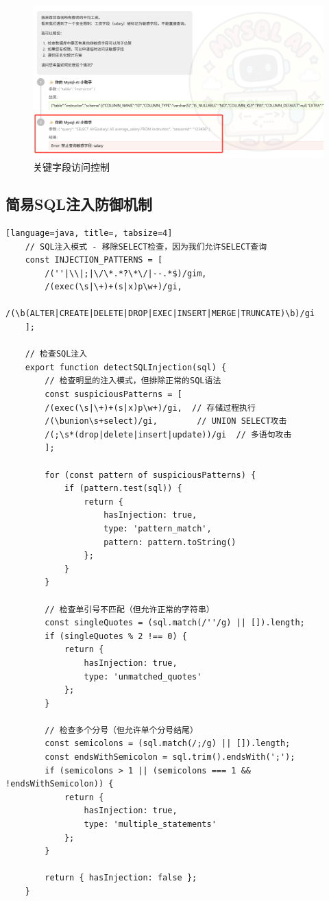 \documentclass{article}
\begin{document}
	\begin{figure}[H]
		\centering
		\includegraphics[width=15cm]{./images/5.敏感数据.jpg}
		\caption{关键字段访问控制}
	\end{figure}
	
	\subsection{简易SQL注入防御机制}
	
	\begin{lstlisting}[language=java, title=, tabsize=4]
	// SQL注入模式 - 移除SELECT检查，因为我们允许SELECT查询
	const INJECTION_PATTERNS = [
		/(''|\\|;|\/\*.*?\*\/|--.*$)/gim,
        /(exec(\s|\+)+(s|x)p\w+)/gi,
		/(\b(ALTER|CREATE|DELETE|DROP|EXEC|INSERT|MERGE|TRUNCATE)\b)/gi
	];
	
	// 检查SQL注入
	export function detectSQLInjection(sql) {
		// 检查明显的注入模式，但排除正常的SQL语法
		const suspiciousPatterns = [
		/(exec(\s|\+)+(s|x)p\w+)/gi,  // 存储过程执行
		/(\bunion\s+select)/gi,        // UNION SELECT攻击
		/(;\s*(drop|delete|insert|update))/gi  // 多语句攻击
		];
		
		for (const pattern of suspiciousPatterns) {
			if (pattern.test(sql)) {
				return {
					hasInjection: true,
					type: 'pattern_match',
					pattern: pattern.toString()
				};
			}
		}
		
		// 检查单引号不匹配（但允许正常的字符串）
		const singleQuotes = (sql.match(/''/g) || []).length;
		if (singleQuotes % 2 !== 0) {
			return {
				hasInjection: true,
				type: 'unmatched_quotes'
			};
		}
		
		// 检查多个分号（但允许单个分号结尾）
		const semicolons = (sql.match(/;/g) || []).length;
		const endsWithSemicolon = sql.trim().endsWith(';');
		if (semicolons > 1 || (semicolons === 1 && !endsWithSemicolon)) {
			return {
				hasInjection: true,
				type: 'multiple_statements'
			};
		}
		
		return { hasInjection: false };
	}
	\end{lstlisting}
	
\end{document}
